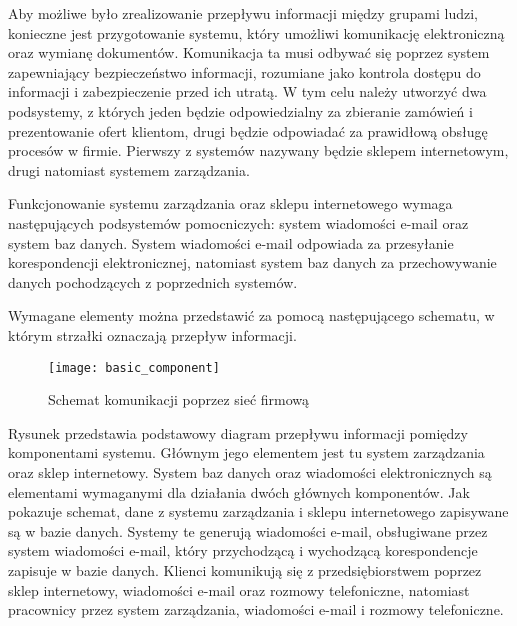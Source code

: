 \par Aby możliwe było zrealizowanie przepływu informacji między grupami ludzi, konieczne jest przygotowanie systemu, który umożliwi komunikację elektroniczną oraz wymianę dokumentów. Komunikacja ta musi odbywać się poprzez system zapewniający bezpieczeństwo informacji, rozumiane jako kontrola dostępu do informacji i zabezpieczenie przed ich utratą. W tym celu należy utworzyć dwa podsystemy, z których jeden będzie odpowiedzialny za zbieranie zamówień i prezentowanie ofert klientom, drugi będzie odpowiadać za prawidłową obsługę procesów w firmie. Pierwszy z systemów nazywany będzie sklepem internetowym, drugi natomiast systemem zarządzania.
	
			\par Funkcjonowanie systemu zarządzania oraz sklepu internetowego wymaga następujących podsystemów pomocniczych: system wiadomości e-mail oraz system baz danych. System wiadomości e-mail odpowiada za przesyłanie korespondencji elektronicznej, natomiast system baz danych za przechowywanie danych pochodzących z poprzednich systemów. 
		
			\par Wymagane elementy można przedstawić za pomocą następującego schematu, w którym strzałki oznaczają przepływ informacji.
		
			\begin{figure}[H]
				\centering
				\texttt{[image: basic\_component]}
				\caption{Schemat komunikacji poprzez sieć firmową}
				\label{basic_comp}
			\end{figure}
		
			\par Rysunek przedstawia podstawowy diagram przepływu informacji pomiędzy komponentami systemu. Głównym jego elementem jest tu system zarządzania oraz sklep internetowy. System baz danych oraz wiadomości elektronicznych są elementami wymaganymi dla działania dwóch głównych komponentów. Jak pokazuje schemat, dane z systemu zarządzania i sklepu internetowego zapisywane są w bazie danych. Systemy te generują wiadomości e-mail, obsługiwane przez system wiadomości e-mail, który przychodzącą i wychodzącą korespondencje zapisuje w bazie danych. Klienci komunikują się z przedsiębiorstwem poprzez sklep internetowy, wiadomości e-mail oraz rozmowy telefoniczne, natomiast pracownicy przez system zarządzania, wiadomości e-mail i rozmowy telefoniczne.
 
